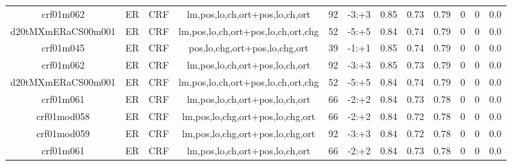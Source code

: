 \documentclass[a4paper]{article}
\begin{document}
\begin{landscape}
\begin{center}
\begin{tabular}{ |c|c|c|c|c|c|c|c|c|c|c|c|}
 	
 
 	
 		
 		\small{ crf01m062 } & ER & CRF & lm,pos,lo,ch,ort+pos,lo,ch,ort  &  92 &  -3:+3  &  0.85 & 0.73 & 0.79  &  0 & 0 & 0.0 \\
 		

 	
 
 	
 		
 		\small{ d20tMXmERaCS00m001 } & ER & CRF & lm,pos,lo,ch,ort+pos,lo,ch,ort,chg  &  52 &  -5:+5  &  0.84 & 0.74 & 0.79  &  0 & 0 & 0.0 \\
 		

 	
 
 	
 		
 		\small{ crf01m045 } & ER & CRF & pos,lo,chg,ort+pos,lo,chg,ort  &  39 &  -1:+1  &  0.85 & 0.74 & 0.79  &  0 & 0 & 0.0 \\
 		

 	
 
 	
 		
 		\small{ crf01m062 } & ER & CRF & lm,pos,lo,ch,ort+pos,lo,ch,ort  &  92 &  -3:+3  &  0.85 & 0.73 & 0.79  &  0 & 0 & 0.0 \\
 		

 	
 
 	
 		
 		\small{ d20tMXmERaCS00m001 } & ER & CRF & lm,pos,lo,ch,ort+pos,lo,ch,ort,chg  &  52 &  -5:+5  &  0.84 & 0.74 & 0.79  &  0 & 0 & 0.0 \\
 		

 	
 
 	
 		
 		\small{ crf01m061 } & ER & CRF & lm,pos,lo,ch,ort+pos,lo,ch,ort  &  66 &  -2:+2  &  0.84 & 0.73 & 0.78  &  0 & 0 & 0.0 \\
 		

 	
 
 	
 		
 		\small{ crf01mod058 } & ER & CRF & lm,pos,lo,chg,ort+pos,lo,chg,ort  &  66 &  -2:+2  &  0.84 & 0.72 & 0.78  &  0 & 0 & 0.0 \\
 		

 	
 
 	
 		
 		\small{ crf01mod059 } & ER & CRF & lm,pos,lo,chg,ort+pos,lo,chg,ort  &  92 &  -3:+3  &  0.84 & 0.72 & 0.78  &  0 & 0 & 0.0 \\
 		

 	
 
 	
 		
 		\small{ crf01m061 } & ER & CRF & lm,pos,lo,ch,ort+pos,lo,ch,ort  &  66 &  -2:+2  &  0.84 & 0.73 & 0.78  &  0 & 0 & 0.0 \\
 		


\end{tabular}
\end{center}
\end{landscape}
\end{document}
